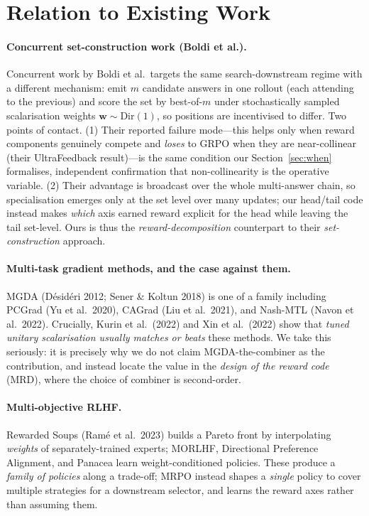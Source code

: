 \documentclass[11pt,a4paper]{article}
\begin{document}
\section{Relation to Existing Work}
\label{sec:related}

\paragraph{Concurrent set-construction work (Boldi et al.).}
Concurrent work by Boldi et al.\ targets the same search-downstream regime with
a different mechanism: emit $m$ candidate answers in one rollout (each attending
to the previous) and score the set by best-of-$m$ under stochastically sampled
scalarisation weights $\bm w\sim\mathrm{Dir}(1)$, so positions are incentivised
to differ.  Two points of contact.  (1) Their reported failure mode---this helps
only when reward components genuinely compete and \emph{loses} to GRPO when they
are near-collinear (their UltraFeedback result)---is the same condition our
Section~\ref{sec:when} formalises, independent confirmation that
non-collinearity is the operative variable.  (2) Their advantage is broadcast
over the whole multi-answer chain, so specialisation emerges only at the set
level over many updates; our head/tail code instead makes \emph{which} axis
earned reward explicit for the head while leaving the tail set-level.  Ours is
thus the \emph{reward-decomposition} counterpart to their
\emph{set-construction} approach.

\paragraph{Multi-task gradient methods, and the case against them.}
MGDA (D\'{e}sid\'{e}ri 2012; Sener \& Koltun 2018) is one of a family
including PCGrad (Yu et al.\ 2020), CAGrad (Liu et al.\ 2021), and Nash-MTL
(Navon et al.\ 2022).  Crucially, Kurin et al.\ (2022) and Xin et al.\
(2022) show that \emph{tuned unitary scalarisation usually matches or beats}
these methods.  We take this seriously: it is precisely why we do not claim
MGDA-the-combiner as the contribution, and instead locate the value in the
\emph{design of the reward code} (MRD), where the choice of combiner is
second-order.

\paragraph{Multi-objective RLHF.}
Rewarded Soups (Ram\'e et al.\ 2023) builds a Pareto front by interpolating
\emph{weights} of separately-trained experts; MORLHF, Directional Preference
Alignment, and Panacea learn weight-conditioned policies.  These produce a
\emph{family of policies} along a trade-off; MRPO instead shapes a
\emph{single} policy to cover multiple strategies for a downstream selector,
and learns the reward axes rather than assuming them.
\end{document}
